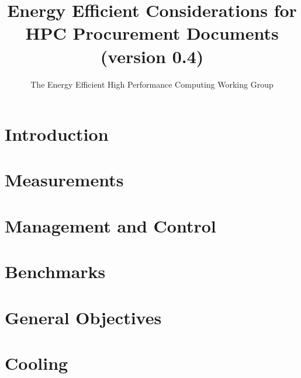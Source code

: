 \documentclass[runningheads,parskip=full]{scrreprt}
\begin{document}
\pagestyle{headings}  %

\title{
Energy Efficient Considerations for HPC Procurement Documents \\
\bigskip
\normalsize{(version 0.4)}
}

\author{The Energy Efficient High Performance Computing Working Group}


\date{ }
\maketitle              %

\tableofcontents
\listoftables
\listoffigures

%
\chapter{Introduction}

\label{sec:intro}

\chapter{Measurements}

\label{sec:measurements}

\chapter{Management and Control}

\label{sec:management}

\chapter{Benchmarks}

\label{sec:benchmarks}

\chapter{General Objectives}

\label{sec:genobjectives}

\chapter{Cooling}

\label{sec:cooling}
\end{document}
